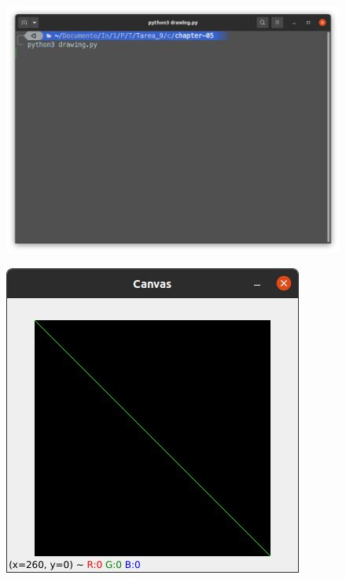 \documentclass[12pt,letterpaper]{article}
\begin{document}
\begin{multicols}{2}
\begin{figure}[H]
\centering
\includegraphics[width = \columnwidth]{Terminal_ch5.png}
\end{figure}

\begin{figure}[H]
\centering
\includegraphics[width = \columnwidth]{Resultado1_ch5.png}
\end{figure}


\end{multicols}
\end{document}

